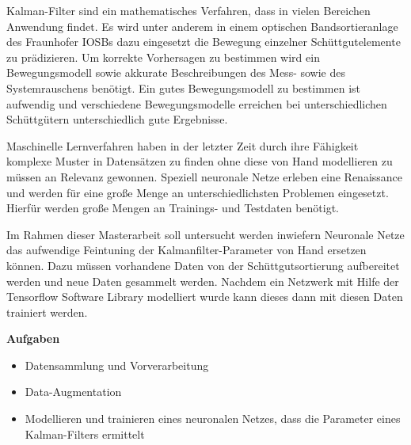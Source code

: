 \documentclass [a4paper, 10pt]{scrartcl}
\begin{document}
\Anfang
Kalman-Filter sind ein mathematisches Verfahren, dass in vielen Bereichen Anwendung findet. 
Es wird unter anderem in einem optischen Bandsortieranlage des Fraunhofer IOSBs dazu eingesetzt die Bewegung einzelner Schüttgutelemente zu prädizieren.
Um korrekte Vorhersagen zu bestimmen wird ein Bewegungsmodell sowie akkurate Beschreibungen des Mess- sowie des Systemrauschens benötigt.
Ein gutes Bewegungsmodell zu bestimmen ist aufwendig und verschiedene Bewegungsmodelle erreichen bei unterschiedlichen Schüttgütern unterschiedlich gute Ergebnisse.


Maschinelle Lernverfahren haben in der letzter Zeit durch ihre Fähigkeit 
komplexe Muster in Datensätzen zu finden ohne diese von Hand modellieren zu müssen an Relevanz gewonnen.
Speziell neuronale Netze erleben eine Renaissance und werden für eine große Menge an unterschiedlichsten Problemen eingesetzt.
Hierfür werden große Mengen an Trainings- und Testdaten benötigt. 

Im Rahmen dieser Masterarbeit soll untersucht werden inwiefern Neuronale Netze das aufwendige Feintuning der Kalmanfilter-Parameter von Hand ersetzen können.
Dazu müssen vorhandene Daten von der Schüttgutsortierung aufbereitet werden und neue Daten gesammelt werden.
Nachdem ein Netzwerk mit Hilfe der Tensorflow Software Library modelliert wurde kann dieses dann mit diesen Daten trainiert werden.





\textbf{Aufgaben}
\begin{itemize}
  \item Datensammlung und Vorverarbeitung
  \item Data-Augmentation
  \item Modellieren und trainieren eines neuronalen Netzes, dass die Parameter eines Kalman-Filters ermittelt
\end{itemize}
\Ende
\end{document}
